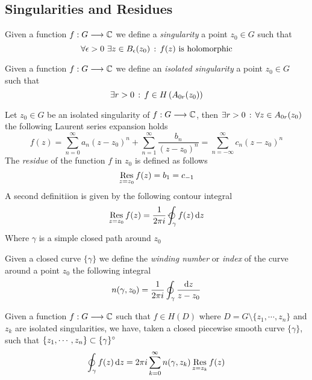 \documentclass[../complete.tex]{subfiles}
\begin{document}
\subsection{Singularities and Residues}
\begin{dfn}[Singularity]
	Given a function $f:G\overset{}{\longrightarrow}\mathbb{C}$ we define a \textit{singularity} a point $z_0\in G$ such that
	\begin{equation}
		\forall\epsilon>0\ \exists z\in B_\epsilon(z_0)\, :\,  f(z)\text{ is holomorphic}
		\label{eq:singularity1}
	\end{equation}
\end{dfn}
\begin{dfn}
	Given a function $f:G\overset{}{\longrightarrow}\mathbb{C}$ we define an \textit{isolated singularity} a point $z_0\in G$ such that
	\begin{equation}
		\exists r>0\, :\,  f\in H\left( A_{0r}(z_0) \right)
		\label{eq:isolatedsing}
	\end{equation}
\end{dfn}
\begin{dfn}[Residue]
	Let $z_0\in G$ be an isolated singularity of $f:G\overset{}{\longrightarrow}\mathbb{C}$, then $\exists r>0\, :\, \forall z\in A_{0r}(z_0)$ the following Laurent series expansion holds
	\begin{equation*}
		f(z)=\sum_{n=0}^{\infty}a_n(z-z_0)^n+\sum_{n=1}^{\infty}\frac{b_n}{(z-z_0)^n}=\sum_{n=-\infty}^{\infty}c_n(z-z_0)^n
	\end{equation*}
	The \textit{residue} of the function $f$ in $z_0$ is defined as follows
	\begin{equation}
		\operatorname*{\mathrm{Res}}_{z=z_0}f(z)=b_1=c_{-1}
		\label{eq:residue}
	\end{equation}
	A second definitiion is given by the following contour integral
	\begin{equation*}
		\res_{z=z_0}f(z)=\frac{1}{2\pi i}\ointccw_\gamma f(z)\diff z
	\end{equation*}
	Where $\gamma$ is a simple closed path around $z_0$
\end{dfn}
\begin{dfn}
	Given a closed curve $\{\gamma\}$ we define the \textit{winding number} or \textit{index} of the curve around a point $z_0$ the following integral
	\begin{equation}
		n(\gamma,z_0)=\frac{1}{2\pi i}\oint_\gamma\frac{\operatorname{d\!} z}{z-z_0}
		\label{eq:windingnumber}
	\end{equation}
\end{dfn}
\begin{thm}
	Given a function $f:G\overset{}{\longrightarrow}\mathbb{C}$ such that $f\in H(D)$ where $D=G\setminus\{z_1,\cdots,z_n\}$ and $z_k$ are isolated singularities, we have, taken a closed piecewise smooth curve $\{\gamma\}$, such that $\{z_1,\cdots,z_n\}\subset\{\gamma\}^{\circ}$
	\begin{equation}
		\oint_\gamma f(z)\operatorname{d\!} z=2\pi i\sum_{k=0}^{\infty}n(\gamma,z_k)\operatorname*{\mathrm{Res}}_{z=z_k}f(z)
		\label{eq:residuetheorem}
	\end{equation}
\end{thm}
\end{document}
